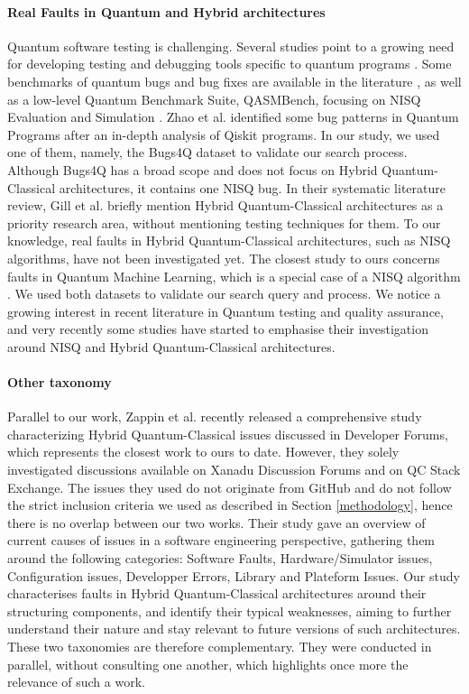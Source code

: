 \paragraph{Real Faults in Quantum and Hybrid architectures}
Quantum software testing is challenging. Several studies point to a growing need for developing testing and debugging tools specific to quantum programs \cite{miranskyy_testing_2019}\cite{paltenghi_bugs_2022}\cite{metwalli_tool_2022}\cite{gill_quantum_2022}\cite{pontolillo_multi-lingual_2023}. Some benchmarks of quantum bugs and bug fixes are available in the literature \cite{zhao_bugs4q_2021}\cite{campos_qbugs_2021}\cite{luo_comprehensive_2022}, as well as a low-level Quantum Benchmark Suite, QASMBench, focusing on
NISQ Evaluation and Simulation \cite{li_qasmbench_2023}. Zhao et al. \cite{zhao_identifying_2021} identified some bug patterns in Quantum Programs after an in-depth analysis of Qiskit programs. In our study, we used one of them, namely, the Bugs4Q dataset \cite{zhao_bugs4q_2021} to validate our search process. Although Bugs4Q has a broad scope and does not focus on Hybrid Quantum-Classical architectures, it contains one NISQ bug. In their systematic literature review, Gill et al. \cite{gill_quantum_2022} briefly mention Hybrid Quantum-Classical architectures as a priority research area, without mentioning testing techniques for them. To our knowledge, real faults in Hybrid Quantum-Classical architectures, such as NISQ algorithms,  have not been investigated yet. The closest study to ours concerns faults in Quantum Machine Learning, which is a special case of a NISQ algorithm \cite{zhao_empirical_2023}. We used both datasets to validate our search query and process. We notice a growing interest in recent literature in Quantum testing and quality assurance, and very recently some studies have started to emphasise their investigation around NISQ and Hybrid Quantum-Classical architectures. 

\paragraph{Other taxonomy}
Parallel to our work, Zappin et al. \cite{zappin_when_2024} recently released a comprehensive study characterizing
Hybrid Quantum-Classical issues discussed in
Developer Forums, which represents the closest work to ours to date. However, they solely investigated discussions available on Xanadu Discussion Forums and on QC Stack Exchange. The issues they used do not originate from GitHub and do not follow the strict inclusion criteria we used as described in Section \ref{methodology}, hence there is no overlap between our two works. Their study gave an overview of current causes of issues in a software engineering perspective, gathering them around the following categories: Software Faults, Hardware/Simulator issues, Configuration issues, Developper Errors, Library and Plateform Issues. Our study characterises faults in Hybrid Quantum-Classical architectures around their structuring components, and identify their typical weaknesses, aiming to further understand their nature and stay relevant to future versions of such architectures. These two taxonomies are therefore complementary. They were conducted in parallel, without consulting one another, which highlights once more the relevance of such a work.